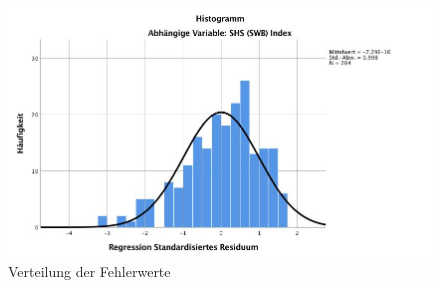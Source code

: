 \begin{figure}[h]
  \centering
     \includegraphics[scale=0.4]{content/Grafik/Histogramm_Hypo3_Normverteilung.jpg}
  \captionsetup{margin=80pt}
  \caption{Verteilung der Fehlerwerte}
  \label{fig:AppHypo3HistogrammResiduen}
\end{figure}